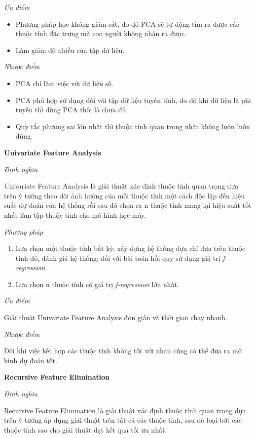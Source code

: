 \documentclass[12pt]{extarticle}
\begin{document}
				\par  \textit{Ưu điểm}
				\begin{itemize}
					\item{Phương pháp học không giám sát, do đó PCA sẽ tự động tìm ra được các thuộc tính đặc trưng mà con người không nhận ra được.}
					\item{Làm giảm độ nhiễu của tập dữ liệu.}
				\end{itemize}
				\par  \textit{Nhược điểm}
				\begin{itemize}
					\item{PCA chỉ làm việc với dữ liệu số.}
					\item{PCA phù hợp sử dụng đối với tập dữ liệu tuyến tính, do đó khi dữ liệu là phi tuyến thì dùng PCA thôi là chưa đủ.}
					\item{Quy tắc phương sai lớn nhất thì thuộc tính quan trọng nhất không luôn luôn đúng.}
				\end{itemize}
			\par \textbf{Univariate Feature Analysis}
				\par \textit{Định nghĩa} 
				\par Univariate Feature Analysis là giải thuật xác định thuộc tính quan trọng dựa trên ý tưởng theo dõi ảnh hưởng của mỗi thuộc tính một cách độc lập đến hiệu suất dự đoán của hệ thống rồi sau đó chọn ra n thuộc tính mang lại hiệu suất tốt nhất làm tập thuộc tính cho mô hình học máy.
				\par \textit{Phương pháp}
				\begin{enumerate}
					\item Lựa chọn một thuộc tính bất kỳ, xây dựng hệ thống dựa chỉ dựa trên thuộc tính đó, đánh giá hệ thống: đối với bài toán hồi quy sử dụng giá trị \textit{f-regression}.
					\item Lựa chọn n thuộc tính có giá trị \textit{f-regression} lớn nhất.
				\end{enumerate}
				\par  \textit{Ưu điểm}
				\par Giải thuật Univariate Feature Analysis đơn giản và thời gian chạy nhanh.
				\par  \textit{Nhược điểm}
				\par Đôi khi việc kết hợp các thuộc tính không tốt với nhau cũng có thể đưa ra mô hình dự đoán tốt.
			\par \textbf{Recursive Feature Elimination}
				\par \textit{Định nghĩa} 
				\par Recursive Feature Elimination là giải thuật xác định thuộc tính quan trọng dựa trên ý tưởng áp dụng giải thuật trên tất cả các thuộc tính, sau đó loại bớt các thuộc tính sao cho giải thuật đạt kết quả tối ưu nhất.
\end{document}
